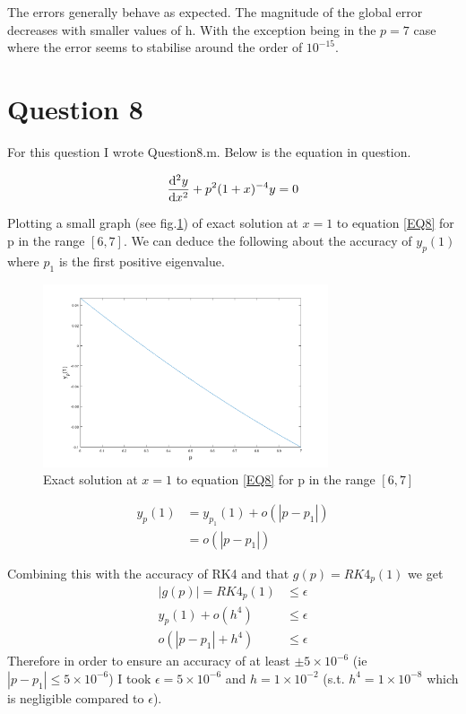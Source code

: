 \documentclass[a4paper]{article}
\begin{document}
The errors generally behave as expected. The magnitude of the global error decreases with smaller values of h. With the exception being in the $p=7$ case where the error seems to stabilise around the order of $10^{-15}$.

\pagebreak
\section*{Question 8}
For this question I wrote Question\textunderscore8.m.  Below is the equation in question.

\begin{equation}\label{EQ8}
\dv[2]{y}{x} + p^2(1+x)^{-4}y = 0
\end{equation}

Plotting a small graph (see fig.\ref{FQ8}) of exact solution at $x=1$ to equation \ref{EQ8} for p in the range $[6,7]$. We can deduce the following about the accuracy of $y_p(1)$ where $p_1$ is the first positive eigenvalue.
\begin{figure}[H]
\centering
\includegraphics[width=0.75\textwidth]{Q8.png}
\caption{Exact solution at $x=1$ to equation \ref{EQ8} for p in the range $[6,7]$}
\label{FQ8}
\end{figure}
\begin{align*}
y_p(1) &= y_{p_1}(1)+o(|p-p_1|) \\
	   &= o(|p-p_1|)
\end{align*}

Combining this with the accuracy of RK4 and that $g(p) = RK4_p(1)$ we get
\begin{align*}
|g(p)| = RK4_p(1)   &\leq \epsilon \\
y_p(1) + o(h^4) 	&\leq \epsilon \\
o(|p-p_1| + h^4) 	&\leq \epsilon
\end{align*}
Therefore in order to ensure an accuracy of at least $\pm5\times10^{-6}$ (ie $|p-p_1| \leq 5\times10^{-6}$) I took $\epsilon = 5\times10^{-6}$ and $h=1\times10^{-2}$ (s.t. $h^4=1\times10^{-8}$ which is negligible compared to $\epsilon$).
\end{document}
